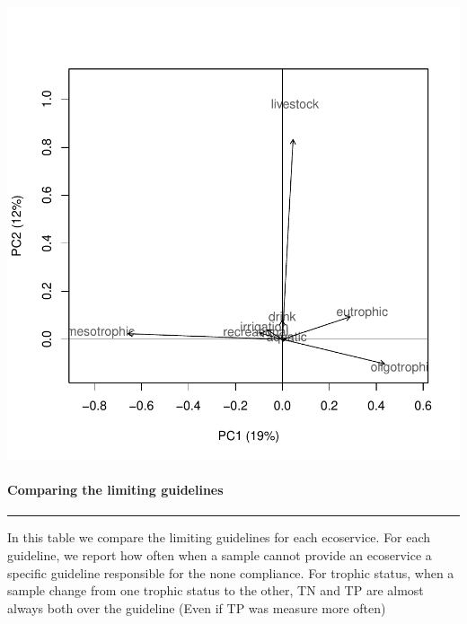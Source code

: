 \documentclass[]{article}
\let\oldparagraph\paragraph
\renewcommand{\paragraph}[1]{\oldparagraph{#1}\mbox{}}
\begin{document}
\begin{center}\includegraphics{figures/services PCA-2} \end{center}

\paragraph{Comparing the limiting
guidelines}\label{comparing-the-limiting-guidelines}

\begin{center}\rule{0.5\linewidth}{\linethickness}\end{center}

In this table we compare the limiting guidelines for each ecoservice.
For each guideline, we report how often when a sample cannot provide an
ecoservice a specific guideline responsible for the none compliance. For
trophic status, when a sample change from one trophic status to the
other, TN and TP are almost always both over the guideline (Even if TP
was measure more often)
\end{document}
